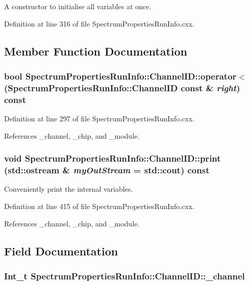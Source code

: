 A constructor to initialise all variables at once. 

Definition at line 316 of file SpectrumPropertiesRunInfo.cxx.

\subsection{Member Function Documentation}
\hypertarget{class_spectrum_properties_run_info_1_1_channel_i_d_a9edace27ee12f1a69137725dbdee49ef}{
\subsubsection[{operator$<$}]{\setlength{\rightskip}{0pt plus 5cm}bool SpectrumPropertiesRunInfo::ChannelID::operator$<$ ({\bf SpectrumPropertiesRunInfo::ChannelID} const \& {\em right}) const}}
\label{class_spectrum_properties_run_info_1_1_channel_i_d_a9edace27ee12f1a69137725dbdee49ef}


Definition at line 297 of file SpectrumPropertiesRunInfo.cxx.

References \_\-channel, \_\-chip, and \_\-module.\hypertarget{class_spectrum_properties_run_info_1_1_channel_i_d_a64f1597a30c83a3edae8673ed731df72}{
\subsubsection[{print}]{\setlength{\rightskip}{0pt plus 5cm}void SpectrumPropertiesRunInfo::ChannelID::print (std::ostream \& {\em myOutStream} = {\ttfamily std::cout}) const}}
\label{class_spectrum_properties_run_info_1_1_channel_i_d_a64f1597a30c83a3edae8673ed731df72}


Conveniently print the internal variables. 

Definition at line 415 of file SpectrumPropertiesRunInfo.cxx.

References \_\-channel, \_\-chip, and \_\-module.

\subsection{Field Documentation}
\hypertarget{class_spectrum_properties_run_info_1_1_channel_i_d_a1a17e4dd2a69226553d3727f313cfb20}{
\subsubsection[{\_\-channel}]{\setlength{\rightskip}{0pt plus 5cm}Int\_\-t {\bf SpectrumPropertiesRunInfo::ChannelID::\_\-channel}}}
\label{class_spectrum_properties_run_info_1_1_channel_i_d_a1a17e4dd2a69226553d3727f313cfb20}


